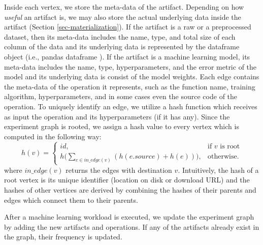 Inside each vertex, we store the meta-data of the artifact.
Depending on how \textit{useful} an artifact is, we may also store the actual underlying data inside the artifact (Section \ref{sec-materialization}).
If the artifact is a raw or a preprocessed dataset, then its meta-data includes the name, type, and total size of each column of the data and its underlying data is represented by the dataframe object (i.e., pandas dataframe \cite{mckinney-proc-scipy-2010}). 
If the artifact is a machine learning model, its meta-data includes the name, type, hyperparameters, and the error metric of the model and its underlying data is consist of the model weights.
Each edge contains the meta-data of the operation it represents, such as the function name, training algorithm, hyperparameters, and in some cases even the source code of the operation.
To uniquely identify an edge, we utilize a hash function which receives as input the operation and its hyperparameters (if it has any).
Since the experiment graph is rooted, we assign a hash value to every vertex which is computed in the following way:
\[
    h(v)= 
\begin{cases}
    id,& \text{if } v \text{ is root}\\
    h\Big(\sum\limits_{e \in in\_edge(v)} (h(e.source) + h(e) ) \Big)  ,              & \text{otherwise}.
\end{cases}
\]
where $in\_edge(v)$ returns the edges with destination $v$. 
Intuitively, the hash of a root vertex is its unique identifier (location on disk or download URL) and the hashes of other vertices are derived by combining the hashes of their parents and edges which connect them to their parents.
%
%

After a machine learning workload is executed, we update the experiment graph by adding the new artifacts and operations.
If any of the artifacts already exist in the graph, their frequency is updated.

